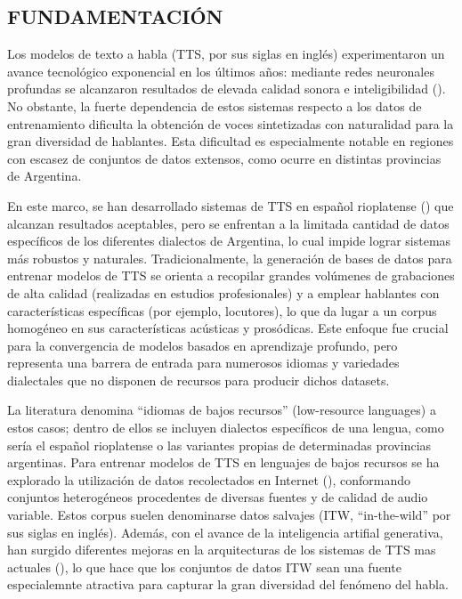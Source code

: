 \subsection{FUNDAMENTACIÓN}

Los modelos de texto a habla (TTS, por sus siglas en inglés) experimentaron un avance tecnológico exponencial en los últimos años: mediante redes neuronales profundas se alcanzaron resultados de elevada calidad sonora e inteligibilidad (\cite{survey1}). No obstante, la fuerte dependencia de estos sistemas respecto a los datos de entrenamiento dificulta la obtención de voces sintetizadas con naturalidad para la gran diversidad de hablantes. Esta dificultad es especialmente notable en regiones con escasez de conjuntos de datos extensos, como ocurre en distintas provincias de Argentina.

En este marco, se han desarrollado sistemas de TTS en español rioplatense (\cite{sintetica}) que alcanzan resultados aceptables, pero se enfrentan a la limitada cantidad de datos específicos de los diferentes dialectos de Argentina, lo cual impide lograr sistemas más robustos y naturales. Tradicionalmente, la generación de bases de datos para entrenar modelos de TTS se orienta a recopilar grandes volúmenes de grabaciones de alta calidad (realizadas en estudios profesionales) y a emplear hablantes con características específicas (por ejemplo, locutores), lo que da lugar a un corpus homogéneo en sus características acústicas y prosódicas. Este enfoque fue crucial para la convergencia de modelos basados en aprendizaje profundo, pero representa una barrera de entrada para numerosos idiomas y variedades dialectales que no disponen de recursos para producir dichos datasets.

La literatura denomina “idiomas de bajos recursos” (low-resource languages) a estos casos; dentro de ellos se incluyen dialectos específicos de una lengua, como sería el español rioplatense o las variantes propias de determinadas provincias argentinas. Para entrenar modelos de TTS en lenguajes de bajos recursos se ha explorado la utilización de datos recolectados en Internet (\cite{erica}), conformando conjuntos heterogéneos procedentes de diversas fuentes y de calidad de audio variable. Estos corpus suelen denominarse datos salvajes (ITW, “in-the-wild” por sus siglas en inglés). Además, con el avance de la inteligencia artifial generativa, han surgido diferentes mejoras en la arquitecturas de los sistemas de TTS mas actuales (\cite{survey2}), lo que hace que los conjuntos de datos ITW sean una fuente especialemnte atractiva para capturar la gran diversidad del fenómeno del habla.

